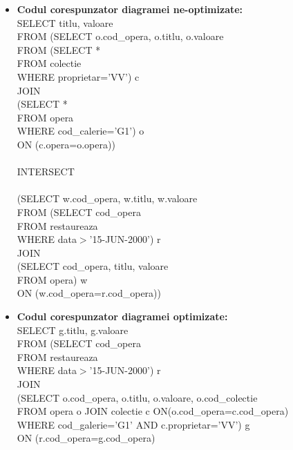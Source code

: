 \documentclass[a4paper,12pt]{article}
\begin{document}
		\begin{itemize}
			\item \textbf{Codul corespunzator diagramei ne-optimizate:}\\
			SELECT titlu, valoare\\
			FROM (SELECT o.cod\_opera, o.titlu, o.valoare\\
			FROM (SELECT *\\
			FROM colectie\\
			WHERE proprietar='VV') c\\
			JOIN\\
			(SELECT *\\
			FROM opera\\
			WHERE cod\_calerie='G1') o\\
			ON (c.opera=o.opera))\\
			\\
			INTERSECT\\
			\\
			(SELECT w.cod\_opera, w.titlu, w.valoare\\
			FROM (SELECT cod\_opera\\
			FROM restaureaza\\
			WHERE data$>$'15-JUN-2000') r\\
			JOIN\\
			(SELECT cod\_opera, titlu, valoare\\
			FROM opera) w\\
			ON (w.cod\_opera=r.cod\_opera))\\
			
			\item \textbf{Codul corespunzator diagramei optimizate:}\\
			
			SELECT g.titlu, g.valoare\\
			FROM (SELECT cod\_opera\\
			FROM restaureaza\\
			WHERE data$>$'15-JUN-2000') r\\
			JOIN\\
			(SELECT o.cod\_opera, o.titlu, o.valoare, o.cod\_colectie\\
			FROM opera o JOIN colectie c ON(o.cod\_opera=c.cod\_opera)\\
			WHERE cod\_galerie='G1' AND c.proprietar='VV') g\\
			ON (r.cod\_opera=g.cod\_opera)\\
			
		\end{itemize}
	
\end{document}
